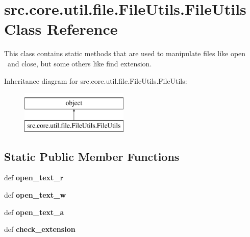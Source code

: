 \hypertarget{classsrc_1_1core_1_1util_1_1file_1_1FileUtils_1_1FileUtils}{\section{src.\-core.\-util.\-file.\-File\-Utils.\-File\-Utils Class Reference}
\label{classsrc_1_1core_1_1util_1_1file_1_1FileUtils_1_1FileUtils}
}


This class contains static methods that are used to manipulate files like open  and close, but some others like find extension.  


Inheritance diagram for src.\-core.\-util.\-file.\-File\-Utils.\-File\-Utils\-:\begin{figure}[H]
\begin{center}
\leavevmode
\includegraphics[height=2.000000cm]{classsrc_1_1core_1_1util_1_1file_1_1FileUtils_1_1FileUtils}
\end{center}
\end{figure}
\subsection*{Static Public Member Functions}
\begin{DoxyCompactItemize}
\item 
\hypertarget{classsrc_1_1core_1_1util_1_1file_1_1FileUtils_1_1FileUtils_a54f1194f71a93143ed90d81a641058a0}{def {\bfseries open\-\_\-text\-\_\-r}}\label{classsrc_1_1core_1_1util_1_1file_1_1FileUtils_1_1FileUtils_a54f1194f71a93143ed90d81a641058a0}

\item 
\hypertarget{classsrc_1_1core_1_1util_1_1file_1_1FileUtils_1_1FileUtils_a79fb7777b4380b9e5fb2c91faac3541f}{def {\bfseries open\-\_\-text\-\_\-w}}\label{classsrc_1_1core_1_1util_1_1file_1_1FileUtils_1_1FileUtils_a79fb7777b4380b9e5fb2c91faac3541f}

\item 
\hypertarget{classsrc_1_1core_1_1util_1_1file_1_1FileUtils_1_1FileUtils_ab64fa0912d4073305a9cb9f0008c8eeb}{def {\bfseries open\-\_\-text\-\_\-a}}\label{classsrc_1_1core_1_1util_1_1file_1_1FileUtils_1_1FileUtils_ab64fa0912d4073305a9cb9f0008c8eeb}

\item 
\hypertarget{classsrc_1_1core_1_1util_1_1file_1_1FileUtils_1_1FileUtils_ab4909a2862c63965df1151a82537bc59}{def {\bfseries check\-\_\-extension}}\label{classsrc_1_1core_1_1util_1_1file_1_1FileUtils_1_1FileUtils_ab4909a2862c63965df1151a82537bc59}

\end{DoxyCompactItemize}


